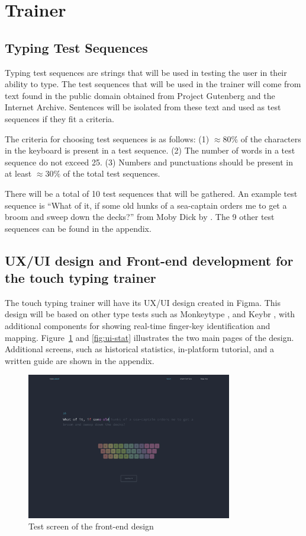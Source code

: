 \documentclass{report}
\begin{document}
\section{Trainer}

\subsection{Typing Test Sequences}
Typing test sequences are strings that will be used in testing the user in their
ability to type. The test sequences that will be used in the trainer will come
from text found in the public domain obtained from Project Gutenberg and the
Internet Archive. Sentences will be isolated from these text and used as test
sequences if they fit a criteria.

The criteria for choosing test sequences is as follows: (1) $\approx80\%$ of the
characters in the keyboard is present in a test sequence. (2) The number of
words in a test sequence do not exceed 25. (3) Numbers and punctuations should
be present in at least $\approx30\%$ of the total test sequences.

There will be a total of 10 test sequences that will be gathered. An example
test sequence is ``What of it, if some old hunks of a sea-captain orders me to
get a broom and sweep down the decks?'' from Moby Dick by \cite{moby-dick}. The
9 other test sequences can be found in the appendix.

\subsection{UX/UI design and Front-end development for the touch typing trainer}
The touch typing trainer will have its UX/UI design created in Figma. This
design will be based on other type tests such as Monkeytype
\parencite{bartnik2021}, and Keybr \parencite{keybr}, with additional components
for showing real-time finger-key identification and mapping.
Figure~\ref{fig:ui-test} and \ref{fig:ui-stat} illustrates the two main pages of
the design. Additional screens, such as historical statistics, in-platform
tutorial, and a written guide are shown in the appendix.

\begin{figure}[H]
	\centering
	\includegraphics[width=0.8\textwidth]{ui-test.png}
	\caption{Test screen of the front-end design}
	\label{fig:ui-test}
	\centering
\end{figure}
\end{document}
